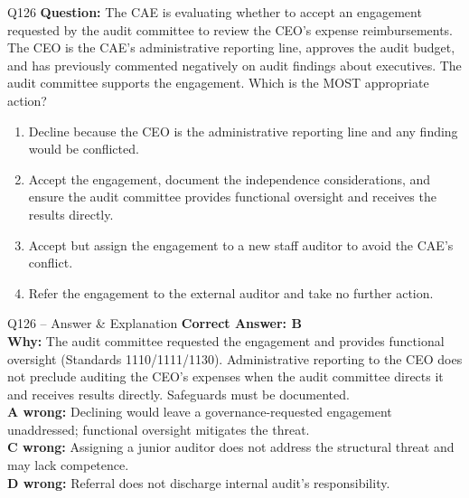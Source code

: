 \documentclass[aspectratio=169,10pt]{beamer}
\begin{document}
	\begin{frame}[t]{Q126}
		\small
		\textbf{Question:} The CAE is evaluating whether to accept an engagement requested by the audit committee to review the CEO's expense reimbursements. The CEO is the CAE's administrative reporting line, approves the audit budget, and has previously commented negatively on audit findings about executives. The audit committee supports the engagement. Which is the MOST appropriate action?
		\begin{enumerate}[label=\Alph*.,itemsep=1pt,topsep=2pt]
			\item Decline because the CEO is the administrative reporting line and any finding would be conflicted.
			\item Accept the engagement, document the independence considerations, and ensure the audit committee provides functional oversight and receives the results directly.
			\item Accept but assign the engagement to a new staff auditor to avoid the CAE's conflict.
			\item Refer the engagement to the external auditor and take no further action.
		\end{enumerate}
	\end{frame}
	
	\begin{frame}[t]{Q126 -- Answer \& Explanation}
		\small
		\textbf{Correct Answer: B} \\[4pt]
		\textbf{Why:} The audit committee requested the engagement and provides functional oversight (Standards 1110/1111/1130). Administrative reporting to the CEO does not preclude auditing the CEO's expenses when the audit committee directs it and receives results directly. Safeguards must be documented. \\[4pt]
		\textbf{A wrong:} Declining would leave a governance-requested engagement unaddressed; functional oversight mitigates the threat. \\[2pt]
		\textbf{C wrong:} Assigning a junior auditor does not address the structural threat and may lack competence. \\[2pt]
		\textbf{D wrong:} Referral does not discharge internal audit's responsibility.
	\end{frame}
	
\end{document}
